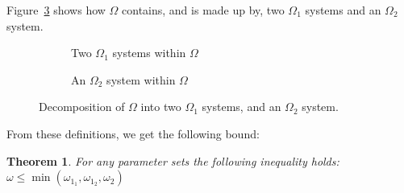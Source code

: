 \documentclass{article}
\newtheorem{theorem}{Theorem}
\numberwithin{equation}{section}
\begin{document}
Figure~\ref{fig:decomposeqnet} shows how $\Omega$ contains, and is made up by, two $\Omega_1$ systems and an $\Omega_2$ system.

\begin{figure}[!htbp]
\begin{center}
\begin{subfigure}[b]{0.85\textwidth}
  
  \caption{Two $\Omega_1$ systems within $\Omega$}
  \label{fig:omega1swithinomega}
\end{subfigure}
\end{center}
\vspace{12mm}
\begin{center}
\begin{subfigure}[b]{0.85\textwidth}
  
  \caption{An $\Omega_2$ system within $\Omega$}
  \label{fig:omega2withinomega}
\end{subfigure}
\end{center}
\caption{Decomposition of $\Omega$ into two $\Omega_1$ systems, and an $\Omega_2$ system.}
\label{fig:decomposeqnet}
\end{figure}


From these definitions, we get the following bound:

\begin{theorem}\label{thrm:bound}
For any parameter sets the following inequality holds:
$\omega \leq \min(\omega_{1_1}, \omega_{1_2}, \omega_2)$
\end{theorem}
\end{document}
